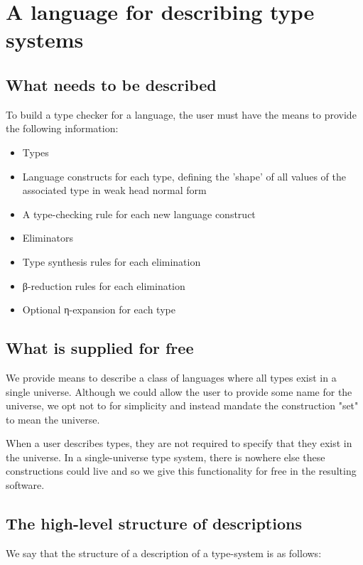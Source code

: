 \chapter{A language for describing type systems}
\label{chapter-DSL}


\section{What needs to be described}

To build a type checker for a language, the user must have
the means to provide the following information:

\begin{itemize}
  \item Types
  \item Language constructs for each type, defining the 'shape' of
    all values of the associated type in weak head normal form
  \item A type-checking rule for each new language construct
  \item Eliminators
  \item Type synthesis rules for each elimination
  \item β-reduction rules for each elimination
  \item Optional η-expansion for each type
\end{itemize}

\section{What is supplied for free}

We provide means to describe a class of languages where all types
exist in a single universe. Although we could allow the user to
provide some name for the universe, we opt not to for simplicity and
instead mandate the construction "set" to mean the universe.

When a user describes types, they are not required to specify that
they exist in the universe. In a single-universe type system, there
is nowhere else these constructions could live and so we give this
functionality for free in the resulting software.

\section{The high-level structure of descriptions}

We say that the structure of a description of a type-system is as
follows: 


